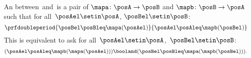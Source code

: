 \begin{ctdefinition}\label{def:antitone-galois-connection}
    An  between~\posA and~\posB is a pair of  $\mapa\colon \posA\to \posB$ and $\mapb \colon \posB\to \posA$ such that for all~$\posAel\setin \posA$, $\posBel\setin \posB$:
    \begin{equation}
        \prfdoubleperiod{\posBel \posBleq \mapa(\posAel)}{\posAel \posAleq \mapb(\posBel)}
    \end{equation}
    This is equivalent to ask for all~$\posAel\setin \posA$,~$\posBel\setin \posB$:
    \begin{equation}
        (\posAel \posAleq \mapb(\mapa(\posAel)))
        \booland (\posBel \posBleq \mapa(\mapb(\posBel))).
    \end{equation}
\end{ctdefinition}


